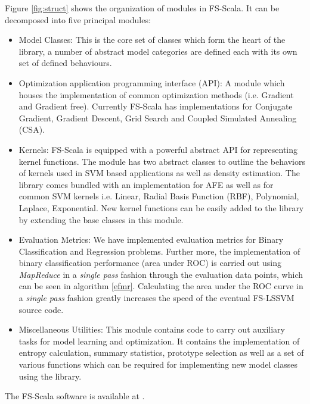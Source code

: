 \documentclass[conference, cmex10]{IEEEtran}
\begin{document}
Figure \ref{fig:struct} shows the organization of modules in FS-Scala. It can be decomposed into five principal modules:
\begin{itemize}
\item Model Classes:
This is the core set of classes which form the heart of the library, a number of abstract model categories are defined each with its own set of defined behaviours. 
\item Optimization application programming interface (API):
A module which houses the implementation of common optimization methods (i.e. Gradient and Gradient free). Currently FS-Scala has implementations for Conjugate Gradient, Gradient Descent, Grid Search and Coupled Simulated Annealing \cite{Xavier-De-Souza2010} (CSA). 
\item Kernels:
FS-Scala is equipped with a powerful abstract API for representing kernel functions. The module has two abstract classes to outline the behaviors of kernels used in SVM based applications as well as density estimation. The library comes bundled with an implementation for AFE as well as for common SVM kernels i.e. Linear, Radial Basis Function (RBF), Polynomial, Laplace, Exponential. New kernel functions can be easily added to the library by extending the base classes in this module.
\item Evaluation Metrics:
We have implemented evaluation metrics for Binary Classification and Regression problems. Further more, the implementation of binary classification performance (area under ROC) is carried out using \textit{MapReduce} in a \textit{single pass} fashion through the evaluation data points, which can be seen in algorithm \ref{efmr}. Calculating the area under the ROC curve in a \textit{single pass} fashion greatly increases the speed of the eventual FS-LSSVM source code.
\item Miscellaneous Utilities:
This module contains code to carry out auxiliary tasks for model learning and optimization. It contains the implementation of entropy calculation, summary statistics, prototype selection as well as a set of various functions which can be required for implementing new model classes using the library.  

\end{itemize}

The FS-Scala software is available at \cite{fsscala}.
\end{document}
